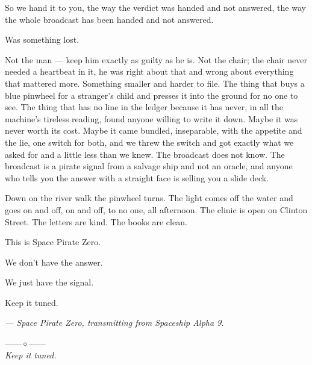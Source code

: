 \documentclass[11pt,openany]{book}
\begin{document}
So we hand it to you, the way the verdict was handed and not answered, the way the whole broadcast has been handed and not answered.

Was something lost.

Not the man --- keep him exactly as guilty as he is. Not the chair; the chair never needed a heartbeat in it, he was right about that and wrong about everything that mattered more. Something smaller and harder to file. The thing that buys a blue pinwheel for a stranger's child and presses it into the ground for no one to see. The thing that has no line in the ledger because it has never, in all the machine's tireless reading, found anyone willing to write it down. Maybe it was never worth its cost. Maybe it came bundled, inseparable, with the appetite and the lie, one switch for both, and we threw the switch and got exactly what we asked for and a little less than we knew. The broadcast does not know. The broadcast is a pirate signal from a salvage ship and not an oracle, and anyone who tells you the answer with a straight face is selling you a slide deck.

Down on the river walk the pinwheel turns. The light comes off the water and goes on and off, on and off, to no one, all afternoon. The clinic is open on Clinton Street. The letters are kind. The books are clean.

This is Space Pirate Zero.

We don't have the answer.

We just have the signal.

Keep it tuned.

\textit{--- Space Pirate Zero, transmitting from Spaceship Alpha 9.}

\backmatter
\thispagestyle{empty}\vspace*{3in}
\begin{center}{\small------\quad$\diamond$\quad------}\\[0.3in]
{\small\textit{Keep it tuned.}}\end{center}
\end{document}
